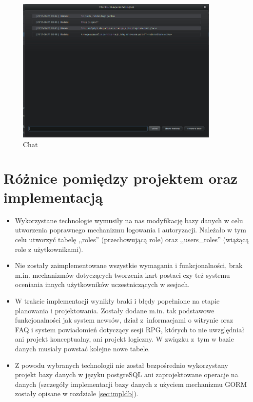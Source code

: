 \begin{figure}[h!]	
\centering
\includegraphics[width=0.9\textwidth]{./img/interfejsy/chat}
\caption{Chat}
\label{fig:faq}
\end{figure}


\clearpage
\section{Różnice pomiędzy projektem oraz implementacją}
\label{sec:roznice}

\begin{itemize}
\item Wykorzystane technologie wymusiły na nas modyfikację bazy danych w celu utworzenia poprawnego mechanizmu logowania i autoryzacji. Należało w tym celu utworzyć tabelę ,,roles'' (przechowującą role) oraz ,,users\_roles'' (wiążącą role z użytkownikami).
\item Nie zostały zaimplementowane wszystkie wymagania i funkcjonalności, brak m.in. mechanizmów dotyczących tworzenia kart postaci czy też systemu oceniania innych użytkowników uczestniczących w sesjach.
\item W trakcie implementacji wynikły braki i błędy popełnione na etapie planowania i projektowania. Zostały dodane m.in. tak podstawowe funkcjonalności jak system newsów, dział z~informacjami o witrynie oraz FAQ i system powiadomień dotyczący sesji RPG, których to nie uwzględniał ani projekt konceptualny, ani projekt logiczny. W związku z~tym w bazie danych musiały powstać kolejne nowe tabele.
\item Z powodu wybranych technologii nie został bezpośrednio wykorzystany projekt bazy danych w języku postgreSQL ani zaprojektowane operacje na danych (szczegóły implementacji bazy danych z użyciem mechanizmu GORM zostały opisane w rozdziale \ref{sec:impldb}).
\end{itemize}

